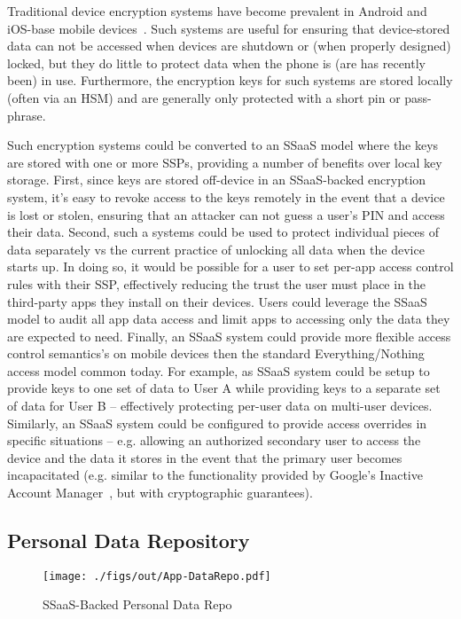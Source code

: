 Traditional device encryption systems have become prevalent in Android
and iOS-base mobile devices~\cite{ars-android-encrypt,
  ars-ios-encrypt}. Such systems are useful for ensuring that
device-stored data can not be accessed when devices are shutdown or
(when properly designed) locked, but they do little to protect data
when the phone is (are has recently been) in use. Furthermore, the
encryption keys for such systems are stored locally (often via an HSM)
and are generally only protected with a short pin or pass-phrase.

Such encryption systems could be converted to an SSaaS model where the
keys are stored with one or more SSPs, providing a number of benefits
over local key storage. First, since keys are stored off-device in an
SSaaS-backed encryption system, it's easy to revoke access to the keys
remotely in the event that a device is lost or stolen, ensuring that
an attacker can not guess a user's PIN and access their data. Second,
such a systems could be used to protect individual pieces of data
separately vs the current practice of unlocking all data when the
device starts up. In doing so, it would be possible for a user to set
per-app access control rules with their SSP, effectively reducing the
trust the user must place in the third-party apps they install on
their devices. Users could leverage the SSaaS model to audit all app
data access and limit apps to accessing only the data they are
expected to need. Finally, an SSaaS system could provide more flexible
access control semantics's on mobile devices then the standard
Everything/Nothing access model common today. For example, as SSaaS
system could be setup to provide keys to one set of data to User A
while providing keys to a separate set of data for User B --
effectively protecting per-user data on multi-user devices. Similarly,
an SSaaS system could be configured to provide access overrides in
specific situations -- e.g. allowing an authorized secondary user to
access the device and the data it stores in the event that the primary
user becomes incapacitated (e.g. similar to the functionality provided
by Google's Inactive Account Manager~\cite{atlantic-google-iam}, but
with cryptographic guarantees).

\subsection{Personal Data Repository}

\begin{figure}[t]
  \centering
  \texttt{[image: ./figs/out/App-DataRepo.pdf]}
  \caption{SSaaS-Backed Personal Data Repo}
  \label{fig:apps-datarepo}
\end{figure}

